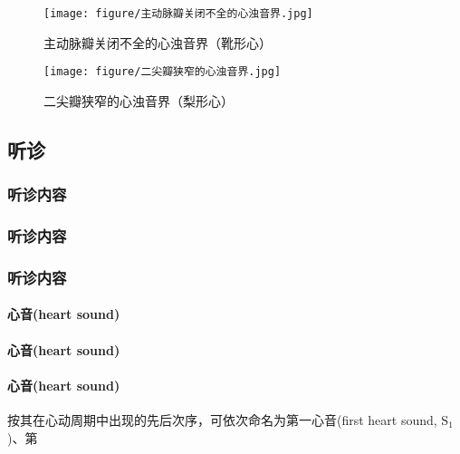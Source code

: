 \documentclass[UTF8]{ctexbook}
\begin{document}
\begin{figure}[htbp]
    \centering
    \texttt{[image: figure/主动脉瓣关闭不全的心浊音界.jpg]}
    \caption{主动脉瓣关闭不全的心浊音界（靴形心）}\label{zhudongmai}
\end{figure}

\begin{figure}[htbp]
    \centering
    \texttt{[image: figure/二尖瓣狭窄的心浊音界.jpg]}
    \caption{二尖瓣狭窄的心浊音界（梨形心）}\label{erjianban}
\end{figure}

\subsection{听诊}
\subsubsection{听诊内容}
\subsubsection{听诊内容}
\subsubsection{听诊内容}
\paragraph{心音(heart sound)}
\paragraph{心音(heart sound)}
\paragraph{心音(heart sound)}按其在心动周期中出现的先后次序，可依次命名为第一心音(first heart sound, S$_1$)、第
\end{document}
